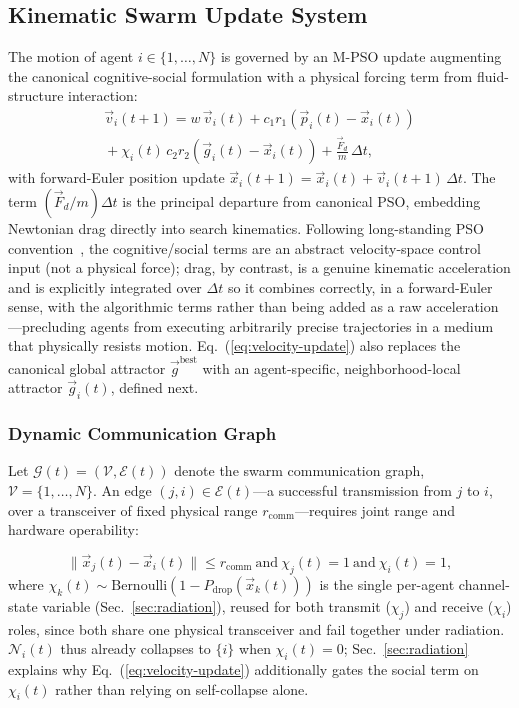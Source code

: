 \documentclass[conference]{IEEEtran}
\begin{document}
\subsection{Kinematic Swarm Update System}
\label{sec:kinematic}

The motion of agent $i \in \{1,\dots,N\}$ is governed by an M-PSO update augmenting the canonical cognitive-social formulation with a physical forcing term from fluid-structure interaction:
\begin{multline}
\vec{v}_i(t+1) = w\,\vec{v}_i(t) + c_1 r_1 \left(\vec{p}_i(t) - \vec{x}_i(t)\right) \\
{} + \chi_i(t)\, c_2 r_2 \left(\vec{g}_i(t) - \vec{x}_i(t)\right) + \frac{\vec{F}_d}{m}\,\Delta t,
\label{eq:velocity-update}
\end{multline}
with forward-Euler position update $\vec{x}_i(t+1) = \vec{x}_i(t) + \vec{v}_i(t+1)\,\Delta t$. The term $(\vec{F}_d/m)\Delta t$ is the principal departure from canonical PSO, embedding Newtonian drag directly into search kinematics. Following long-standing PSO convention~\cite{pso_canonical,shi_eberhart_1998}, the cognitive/social terms are an abstract velocity-space control input (not a physical force); drag, by contrast, is a genuine kinematic acceleration and is explicitly integrated over $\Delta t$ so it combines correctly, in a forward-Euler sense, with the algorithmic terms rather than being added as a raw acceleration---precluding agents from executing arbitrarily precise trajectories in a medium that physically resists motion. Eq.~(\ref{eq:velocity-update}) also replaces the canonical global attractor $\vec{g}^{\text{best}}$ with an agent-specific, neighborhood-local attractor $\vec{g}_i(t)$, defined next.

\subsubsection{Dynamic Communication Graph}
\label{sec:comm-graph}

Let $\mathcal{G}(t) = (\mathcal{V}, \mathcal{E}(t))$ denote the swarm communication graph, $\mathcal{V}=\{1,\dots,N\}$. An edge $(j,i)\in\mathcal{E}(t)$---a successful transmission from $j$ to $i$, over a transceiver of fixed physical range $r_{\text{comm}}$---requires joint range and hardware operability:

\begin{equation}
\|\vec{x}_j(t) - \vec{x}_i(t)\| \le r_{\text{comm}} \ \text{and}\ \chi_j(t) = 1 \ \text{and}\ \chi_i(t) = 1,
\label{eq:comm-edge}
\end{equation}
where $\chi_k(t) \sim \text{Bernoulli}(1-P_{\text{drop}}(\vec{x}_k(t)))$ is the single per-agent channel-state variable (Sec.~\ref{sec:radiation}), reused for both transmit ($\chi_j$) and receive ($\chi_i$) roles, since both share one physical transceiver and fail together under radiation. $\mathcal{N}_i(t)$ thus already collapses to $\{i\}$ when $\chi_i(t)=0$; Sec.~\ref{sec:radiation} explains why Eq.~(\ref{eq:velocity-update}) additionally gates the social term on $\chi_i(t)$ rather than relying on self-collapse alone.
\end{document}
